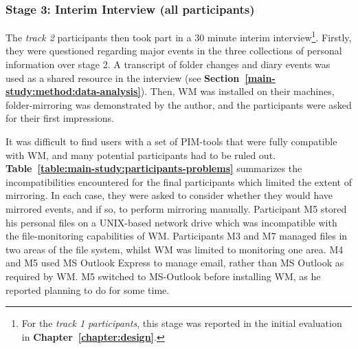 \subsubsection{Stage 3: Interim Interview (all participants)}

The \textit{track 2} participants then took part in a 30 minute interim interview\footnote{For the \textit{track 1 participants}, this stage was reported in the initial evaluation in \textbf{Chapter~\ref{chapter:design}}.}. Firstly, they were questioned regarding major events in the three collections of personal information over stage 2.  A transcript of folder changes and diary events was used as a shared resource in the interview (see \textbf{Section~\ref{main-study:method:data-analysis}}).
Then, WM was installed on their machines, folder-mirroring was demonstrated by the author, and the participants were asked for their first impressions.

It was difficult to find users with a set of PIM-tools that were fully compatible with WM, and many potential participants had to be ruled out. \textbf{Table~\ref{table:main-study:participants-problems}} summarizes the incompatibilities encountered for the final participants which limited the extent of mirroring. In each case, they were asked to consider whether they would have mirrored events, and if so, to perform mirroring manually.
Participant M5 stored his personal files on a UNIX-based network drive which was incompatible with the file-monitoring capabilities of WM.  %
Participants M3 and M7 managed files in two areas of the file system, whilst WM was limited to monitoring one area.  M4 and M5 used MS Outlook Express to manage email, rather than MS Outlook as required by WM.  M5 switched to MS-Outlook before installing WM, as he reported planning to do for some time.

